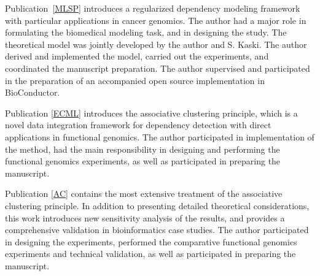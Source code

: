 Publication~\ref{MLSP} introduces a regularized dependency modeling
framework with particular applications in cancer genomics. The author
had a major role in formulating the biomedical modeling task, and in
designing the study. The theoretical model was jointly developed by
the author and S. Kaski. The author derived and implemented the model,
carried out the experiments, and coordinated the manuscript
preparation. The author supervised and participated in the preparation
of an accompanied open source implementation in BioConductor.

Publication \ref{ECML} introduces the associative clustering
principle, which is a novel data integration framework for dependency
detection with direct applications in functional genomics. The author
participated in implementation of the method, had the main
responsibility in designing and performing the functional genomics
experiments, as well as participated in preparing the manuscript.

Publication \ref{AC} contains the most extensive treatment of the
associative clustering principle. In addition to presenting detailed
theoretical considerations, this work introduces new sensitivity
analysis of the results, and provides a comprehensive validation in
bioinformatics case studies. The author participated in designing the
experiments, performed the comparative functional genomics experiments
and technical validation, as well as participated in preparing the
manuscript.
